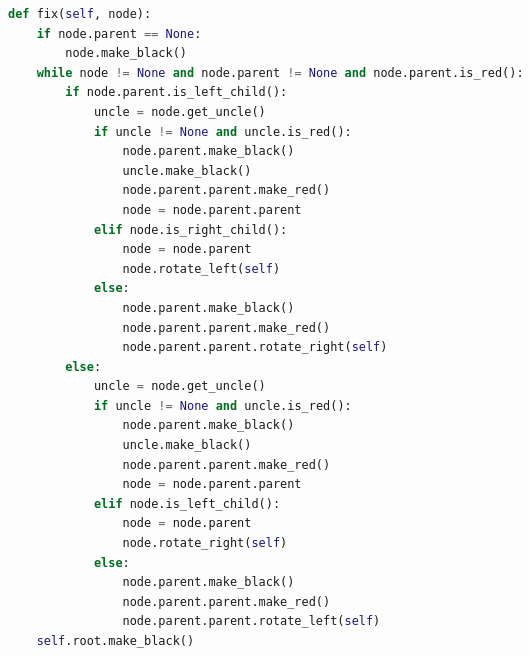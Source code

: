 \documentclass[letterpaper, 8pt]{extarticle}
\begin{document}
\begin{multicols*}{5}
\begin{lstlisting}[language=Python]
def fix(self, node):
    if node.parent == None:
        node.make_black()
    while node != None and node.parent != None and node.parent.is_red():
        if node.parent.is_left_child():
            uncle = node.get_uncle()
            if uncle != None and uncle.is_red():
                node.parent.make_black()
                uncle.make_black()
                node.parent.parent.make_red()
                node = node.parent.parent
            elif node.is_right_child():
                node = node.parent
                node.rotate_left(self)
            else:
                node.parent.make_black()
                node.parent.parent.make_red()
                node.parent.parent.rotate_right(self)
        else:
            uncle = node.get_uncle()
            if uncle != None and uncle.is_red():
                node.parent.make_black()
                uncle.make_black()
                node.parent.parent.make_red()
                node = node.parent.parent
            elif node.is_left_child():
                node = node.parent
                node.rotate_right(self)
            else:
                node.parent.make_black()
                node.parent.parent.make_red()
                node.parent.parent.rotate_left(self)
    self.root.make_black()
\end{lstlisting}

\newpage


\end{multicols*}
\end{document}
